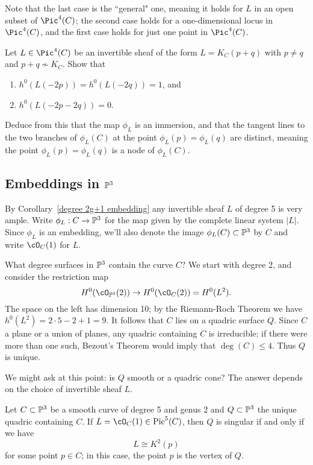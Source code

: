 Note that the last case is the ``general" one, meaning it holds for $L$ in an open subset of $\Pic^4(C)$; the second case holds for a one-dimensional locus in $\Pic^4(C)$, and the first case holds for just one point in $\Pic^4(C)$.

\begin{exercise}\label{nodal quartic}
Let $L \in \Pic^4(C)$ be an invertible sheaf of the form $L = K_C(p+q)$ with $p \neq q$ and $p+q \not\sim K_C$. Show that
\begin{enumerate}
\item $h^0(L(-2p)) = h^0(L(-2q)) = 1$, and
\item $h^0(L(-2p-2q)) = 0$.
\end{enumerate}
Deduce from this that the map $\phi_L$ is an immersion, and that the tangent lines to the two branches of $\phi_L(C)$ at the point $\phi_L(p) = \phi_L(q)$ are distinct, meaning the point $\phi_L(p) = \phi_L(q)$ is a node of $\phi_L(C)$.
\end{exercise}


\subsection{Embeddings in $\PP^3$}

By Corollary~\ref{degree 2g+1 embedding} any invertible sheaf $L$ of degree 5 is very ample. 
Write $\phi_L : C \to \PP^3$ for the map given by the complete linear system $|L|$. Since $\phi_L$ is an embedding, we'll also denote the image $\phi_L(C) \subset \PP^3$ by $C$ and write $\cO_C(1)$ for $L$.

What degree surfaces in $\PP^3$ contain the curve $C$? We start with degree 2, and consider the restriction map
$$
H^0(\cO_{\PP^3}(2)) \to H^0(\cO_C(2)) = H^0(L^2).
$$
The space on the left has dimension 10; by the Riemann-Roch Theorem we have $h^0(L^2) = 2\cdot5 - 2 + 1 = 9$. It follows that $C$ lies on a quadric surface $Q$. Since $C$ a plane or a union of planes, any quadric containing $C$ is irreducible; if there were more than one such, Bezout's Theorem would imply that $\deg(C) \leq 4$. Thus $Q$ is unique.

We might ask at this point: is $Q$ smooth or a quadric cone? The answer depends on the choice of invertible sheaf $L$. 

\begin{proposition}\label{genus 2 embedding}
Let $C \subset \PP^3$ be a smooth curve of degree 5 and genus 2 and $Q \subset \PP^3$ the unique quadric containing $C$. If $L = \cO_C(1) \in \pic^5(C)$, then $Q$ is singular if and only if we have
$$
L \cong K^2(p)
$$
for some point $p \in C$; in this case, the point $p$ is the vertex of $Q$.
\end{proposition}

